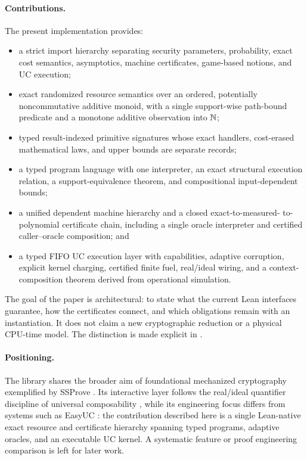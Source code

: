 \paragraph{Contributions.}
The present implementation provides:

\begin{itemize}
  \item a strict import hierarchy separating security parameters,
    probability, exact cost semantics, asymptotics, machine certificates,
    game-based notions, and UC execution;
  \item exact randomized resource semantics over an ordered, potentially
    noncommutative additive monoid, with a single support-wise path-bound
    predicate and a monotone additive observation into \(\mathbb{N}\);
  \item typed result-indexed primitive signatures whose exact handlers,
    cost-erased mathematical laws, and upper bounds are separate records;
  \item a typed program language with one interpreter, an exact structural
    execution relation, a support-equivalence theorem, and compositional
    input-dependent bounds;
  \item a unified dependent machine hierarchy and a closed exact-to-measured-
    to-polynomial certificate chain, including a single oracle interpreter and
    certified caller--oracle composition; and
  \item a typed FIFO UC execution layer with capabilities, adaptive
    corruption, explicit kernel charging, certified finite fuel, real/ideal
    wiring, and a context-composition theorem derived from operational
    simulation.
\end{itemize}

The goal of the paper is architectural: to state what the current Lean
interfaces guarantee, how the certificates connect, and which obligations
remain with an instantiation.  It does not claim a new cryptographic reduction
or a physical CPU-time model.  The distinction is made explicit in
.

\paragraph{Positioning.}
The library shares the broader aim of foundational mechanized cryptography
exemplified by SSProve \cite{CSF:AHRVWH21}.  Its interactive layer follows the
real/ideal quantifier discipline of universal composability
\cite{FOCS:Canetti01}, while its engineering focus differs from systems such as
EasyUC \cite{CSF:CanStoVar19}: the contribution described here is a single
Lean-native exact resource and certificate hierarchy spanning typed programs,
adaptive oracles, and an executable UC kernel.  A systematic feature or proof
engineering comparison is left for later work.

